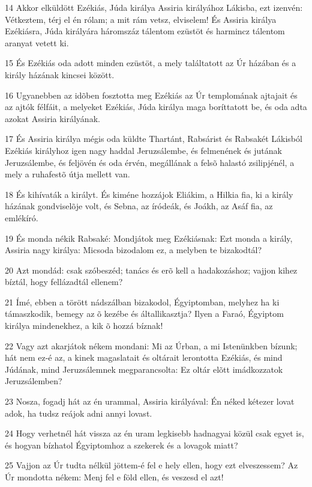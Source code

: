 \par 14 Akkor elküldött Ezékiás, Júda királya Assiria királyához Lákisba, ezt izenvén: Vétkeztem, térj el én rólam; a mit rám vetsz, elviselem! És Assiria királya Ezékiásra, Júda királyára háromszáz tálentom ezüstöt és harmincz tálentom aranyat vetett ki.
\par 15 És Ezékiás oda adott minden ezüstöt, a mely találtatott az Úr házában és a király házának kincsei között.
\par 16 Ugyanebben az idõben fosztotta meg Ezékiás az Úr templomának ajtajait és az ajtók félfáit, a melyeket Ezékiás, Júda királya maga boríttatott be, és oda adta azokat Assiria királyának.
\par 17 És Assiria királya mégis oda küldte Thartánt, Rabsárist és Rabsakét Lákisból Ezékiás királyhoz igen nagy haddal Jeruzsálembe, és felmenének és jutának Jeruzsálembe, és feljövén és oda érvén, megállának a felsõ halastó zsilipjénél, a mely a ruhafestõ útja mellett van.
\par 18 És kihívaták a királyt. És kiméne hozzájok Eliákim, a Hilkia fia, ki a király házának gondviselõje volt, és Sebna, az íródeák, és Joákh, az Asáf fia, az emlékíró.
\par 19 És monda nékik Rabsaké: Mondjátok meg Ezékiásnak: Ezt monda a király, Assiria nagy királya: Micsoda bizodalom ez, a melyben te bizakodtál?
\par 20 Azt mondád: csak szóbeszéd; tanács és erõ kell a hadakozáshoz; vajjon kihez bíztál, hogy fellázadtál ellenem?
\par 21 Ímé, ebben a törött nádszálban bizakodol, Égyiptomban, melyhez ha ki támaszkodik, bemegy az õ kezébe és általlikasztja? Ilyen a Faraó, Égyiptom királya mindenekhez, a kik õ hozzá bíznak!
\par 22 Vagy azt akarjátok nékem mondani: Mi az Úrban, a mi Istenünkben bízunk; hát nem ez-é az, a kinek magaslatait és oltárait lerontotta Ezékiás, és mind Júdának, mind Jeruzsálemnek megparancsolta: Ez oltár elõtt imádkozzatok Jeruzsálemben?
\par 23 Nosza, fogadj hát az én urammal, Assiria királyával: Én néked kétezer lovat adok, ha tudsz reájok adni annyi lovast.
\par 24 Hogy verhetnél hát vissza az én uram legkisebb hadnagyai közül csak egyet is, és hogyan bízhatol Égyiptomhoz a szekerek és a lovagok miatt?
\par 25 Vajjon az Úr tudta nélkül jöttem-é fel e hely ellen, hogy ezt elveszessem? Az Úr mondotta nékem: Menj fel e föld ellen, és veszesd el azt!
